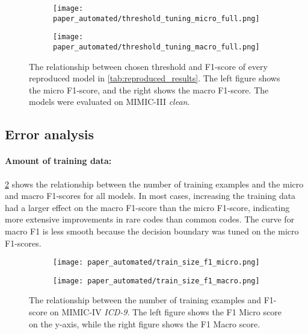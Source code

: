 {\begin{figure}
    \centering
    \begin{subfigure}[b]{0.9\textwidth}
        \centering
        \texttt{[image: paper\_automated/threshold\_tuning\_micro\_full.png]}
    \end{subfigure}
    \begin{subfigure}[b]{0.9\textwidth}
        \centering
        \texttt{[image: paper\_automated/threshold\_tuning\_macro\_full.png]}
    \end{subfigure}%
    \caption[Relationship between chosen threshold and F1-score of every reproduced model.]{ The relationship between chosen threshold and F1-score of every reproduced model in \cref{tab:reproduced_results}. The left figure shows the micro F1-score, and the right shows the macro F1-score. The models were evaluated on MIMIC-III \textit{clean}.}
    \label{fig:threshold_tuning}
\end{figure}


\subsection{Error analysis}

\paragraph{Amount of training data:}

\cref{fig:train_size} shows the relationship between the number of training examples and the micro and macro F1-scores for all models.
In most cases, increasing the training data had a larger effect on the macro F1-score than the micro F1-score, indicating more extensive improvements in rare codes than common codes. The curve for macro F1 is less smooth because the decision boundary was tuned on the micro F1-scores.

\begin{figure}
    \centering
    \begin{subfigure}[b]{0.95\textwidth}
        \centering
        \texttt{[image: paper\_automated/train\_size\_f1\_micro.png]}
    \end{subfigure}
    \begin{subfigure}[b]{0.95\textwidth}
        \centering
        \texttt{[image: paper\_automated/train\_size\_f1\_macro.png]}
    \end{subfigure}
    \caption[The relationship between the number of training examples and F1-score on MIMIC-IV \textit{ICD-9}.]{  The relationship between the number of training examples and F1-score on MIMIC-IV \textit{ICD-9}. The left figure shows the F1 Micro score on the y-axis, while the right figure shows the F1 Macro score.}
    \label{fig:train_size}
\end{figure}


}

